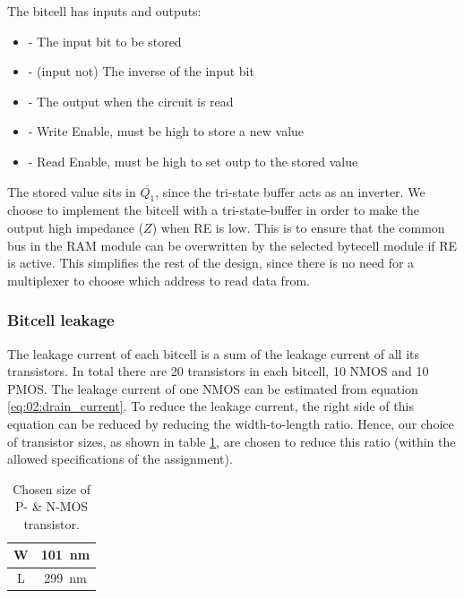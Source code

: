 The bitcell has inputs and outputs:
\begin{itemize}
    \item {} - The input bit to be stored
    \item {} - (input not) The inverse of the input bit
    \item {} - The output when the circuit is read
    \item {} - Write Enable, must be high to store a new value
    \item {} - Read Enable, must be high to set outp to the stored value
\end{itemize}

The stored value sits in $\overline{Q_1}$, since the tri-state buffer acts as an inverter. We choose to implement the bitcell with a tri-state-buffer in order to make the output high impedance ($Z$) when \textsc{RE} is low. This is to ensure that the common bus in the RAM module can be overwritten by the selected bytecell module if \textsc{RE} is active.
This simplifies the rest of the design, since there is no need for a multiplexer to choose which address to read data from.

\subsubsection{Bitcell leakage}
The leakage current of each bitcell is a sum of the leakage current of all its transistors. In total there are 20 transistors in each bitcell, 10 NMOS and 10 PMOS. The leakage current of one NMOS can be estimated from equation \ref{eq:02:drain_current}. To reduce the leakage current, the right side of this equation can be reduced by reducing the width-to-length ratio. Hence, our choice of transistor sizes, as shown in table \ref{tab:03:transistor_size}, are chosen to reduce this ratio (within the allowed specifications of the assignment).

\begin{table}[H]
    \centering
    \caption{Chosen size of P- \& N-MOS transistor.}
    \label{tab:03:transistor_size}
    \begin{tabular}{|c|c|}
                                \hline
         W  &  \SI{101}{nm} \\  \hline
         L  &  \SI{299}{nm} \\  \hline
    \end{tabular}
\end{table}

